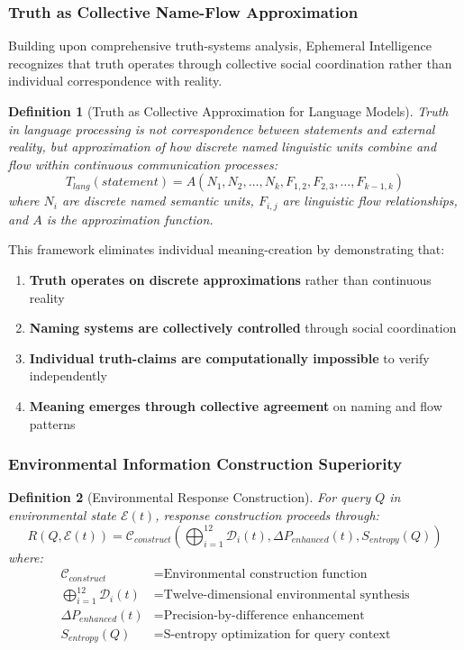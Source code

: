 \documentclass[12pt,a4paper]{article}
\newtheorem{definition}{Definition}
\begin{document}
\subsubsection{Truth as Collective Name-Flow Approximation}

Building upon comprehensive truth-systems analysis, Ephemeral Intelligence recognizes that truth operates through collective social coordination rather than individual correspondence with reality.

\begin{definition}[Truth as Collective Approximation for Language Models]
Truth in language processing is not correspondence between statements and external reality, but approximation of how discrete named linguistic units combine and flow within continuous communication processes:
\begin{equation}
T_{lang}(statement) = A(N_1, N_2, \ldots, N_k, F_{1,2}, F_{2,3}, \ldots, F_{k-1,k})
\end{equation}
where $N_i$ are discrete named semantic units, $F_{i,j}$ are linguistic flow relationships, and $A$ is the approximation function.
\end{definition}

This framework eliminates individual meaning-creation by demonstrating that:
\begin{enumerate}
\item \textbf{Truth operates on discrete approximations} rather than continuous reality
\item \textbf{Naming systems are collectively controlled} through social coordination
\item \textbf{Individual truth-claims are computationally impossible} to verify independently  
\item \textbf{Meaning emerges through collective agreement} on naming and flow patterns
\end{enumerate}

\subsubsection{Environmental Information Construction Superiority}

\begin{definition}[Environmental Response Construction]
For query $Q$ in environmental state $\mathcal{E}(t)$, response construction proceeds through:
\begin{equation}
R(Q, \mathcal{E}(t)) = \mathcal{C}_{construct}\left(\bigoplus_{i=1}^{12} \mathcal{D}_i(t), \Delta P_{enhanced}(t), S_{entropy}(Q)\right)
\end{equation}
where:
\begin{align}
\mathcal{C}_{construct} &= \text{Environmental construction function} \\
\bigoplus_{i=1}^{12} \mathcal{D}_i(t) &= \text{Twelve-dimensional environmental synthesis} \\
\Delta P_{enhanced}(t) &= \text{Precision-by-difference enhancement} \\
S_{entropy}(Q) &= \text{S-entropy optimization for query context}
\end{align}
\end{definition}
\end{document}
